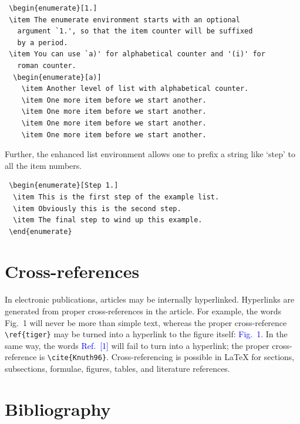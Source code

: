 \documentclass[a4paper,fleqn]{cas-sc}
\begin{document}
\begin{verbatim}
 \begin{enumerate}[1.]
 \item The enumerate environment starts with an optional
   argument `1.', so that the item counter will be suffixed
   by a period.
 \item You can use `a)' for alphabetical counter and '(i)' for
   roman counter.
  \begin{enumerate}[a)]
    \item Another level of list with alphabetical counter.
    \item One more item before we start another.
    \item One more item before we start another.
    \item One more item before we start another.
    \item One more item before we start another.
\end{verbatim}

Further, the enhanced list environment allows one to prefix a
string like `step' to all the item numbers.

\begin{verbatim}
 \begin{enumerate}[Step 1.]
  \item This is the first step of the example list.
  \item Obviously this is the second step.
  \item The final step to wind up this example.
 \end{enumerate}
\end{verbatim}

\section{Cross-references}
In electronic publications, articles may be internally
hyperlinked. Hyperlinks are generated from proper
cross-references in the article.  For example, the words
\textcolor{black!80}{Fig.~1} will never be more than simple text,
whereas the proper cross-reference \verb+\ref{tiger}+ may be
turned into a hyperlink to the figure itself:
\textcolor{blue}{Fig.~1}.  In the same way,
the words \textcolor{blue}{Ref.~[1]} will fail to turn into a
hyperlink; the proper cross-reference is \verb+\cite{Knuth96}+.
Cross-referencing is possible in \LaTeX{} for sections,
subsections, formulae, figures, tables, and literature
references.

\section{Bibliography}
\end{document}
